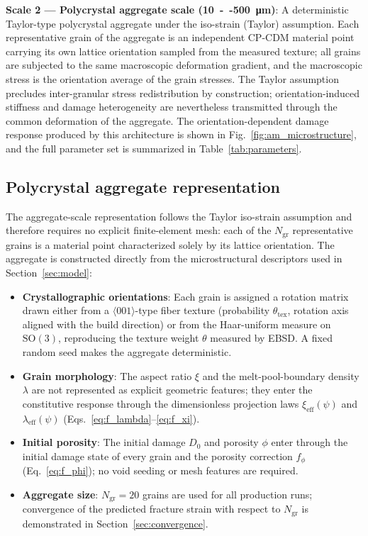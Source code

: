 \noindent\textbf{Scale 2 --- Polycrystal aggregate scale (\SI{10}{--}\SI{500}{\micro\meter})}: A deterministic Taylor-type polycrystal aggregate under the iso-strain (Taylor) assumption. Each representative grain of the aggregate is an independent CP-CDM material point carrying its own lattice orientation sampled from the measured texture; all grains are subjected to the same macroscopic deformation gradient, and the macroscopic stress is the orientation average of the grain stresses. The Taylor assumption precludes inter-granular stress redistribution by construction; orientation-induced stiffness and damage heterogeneity are nevertheless transmitted through the common deformation of the aggregate. The orientation-dependent damage response produced by this architecture is shown in Fig.~\ref{fig:am_microstructure}, and the full parameter set is summarized in Table~\ref{tab:parameters}.

\subsection{Polycrystal aggregate representation}

The aggregate-scale representation follows the Taylor iso-strain assumption and therefore requires no explicit finite-element mesh: each of the $N_{\text{gr}}$ representative grains is a material point characterized solely by its lattice orientation. The aggregate is constructed directly from the microstructural descriptors used in Section~\ref{sec:model}:

\begin{itemize}
    \item \textbf{Crystallographic orientations}: Each grain is assigned a rotation matrix drawn either from a $\langle001\rangle$-type fiber texture (probability $\theta_{\text{tex}}$, rotation axis aligned with the build direction) or from the Haar-uniform measure on $\mathrm{SO}(3)$, reproducing the texture weight $\theta$ measured by EBSD. A fixed random seed makes the aggregate deterministic.
    \item \textbf{Grain morphology}: The aspect ratio $\xi$ and the melt-pool-boundary density $\lambda$ are not represented as explicit geometric features; they enter the constitutive response through the dimensionless projection laws $\xi_{\text{eff}}(\psi)$ and $\lambda_{\text{eff}}(\psi)$ (Eqs.~\eqref{eq:f_lambda}--\eqref{eq:f_xi}).
    \item \textbf{Initial porosity}: The initial damage $D_0$ and porosity $\phi$ enter through the initial damage state of every grain and the porosity correction $f_\phi$ (Eq.~\eqref{eq:f_phi}); no void seeding or mesh features are required.
    \item \textbf{Aggregate size}: $N_{\text{gr}} = 20$ grains are used for all production runs; convergence of the predicted fracture strain with respect to $N_{\text{gr}}$ is demonstrated in Section~\ref{sec:convergence}.
\end{itemize}

